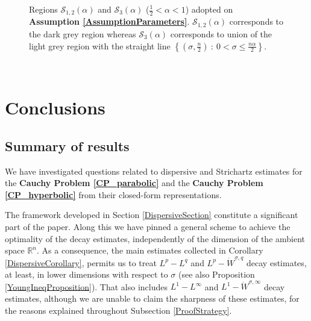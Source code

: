 \documentclass{amsart}
\theoremstyle{definition}
\theoremstyle{remark}
\numberwithin{equation}{section}
\newcommand{\BR}{{\mathbb R}}
\begin{document}
\begin{figure}
			\caption{Regions $\mathcal{S}_{1,2}(\alpha)$ and $\mathcal{S}_{3}(\alpha)$ ($\frac{1}{2}<\alpha<1$) adopted on {\bf Assumption \ref{AssumptionParameters}}. $\mathcal{S}_{1,2}(\alpha)$ corresponds to the dark grey region whereas $\mathcal{S}_3(\alpha)$ corresponds to union of the light grey region with the straight line $\displaystyle \left\{\left(\sigma,\frac{n}{2}\right)~:~0<\sigma\leq\frac{n\alpha}{2}\right\}.$}\label{StrichartzFigure2} 
		\end{figure}
		
		
		\newpage
		~
		\newpage
		\section{Conclusions}\label{Conclusions}
		
		\subsection{Summary of results}
		
		We have investigated questions related to dispersive and Strichartz estimates for the {\bf Cauchy Problem \ref{CP_parabolic}} and the {\bf Cauchy Problem \ref{CP_hyperbolic}} from their closed-form representations.
		
		The framework developed in Section \ref{DispersiveSection} constitute a significant part of the paper. Along this we have pinned a general scheme to achieve the optimality of the decay estimates, independently of the dimension of the ambient space $\BR^n$. As a consequence, the main estimates collected in Corollary \ref{DispersiveCorollary}, permits us to treat $L^p-L^q$ and $L^p-\dot{W}^{\sigma,q}$ decay estimates, at least, in lower dimensions with respect to $\sigma$ (see also Proposition \ref{YoungIneqProposition}). That also includes $L^1-L^\infty$ and $L^1-\dot{W}^{\sigma,\infty}$ decay estimates, although we are unable to claim the sharpness of these estimates, for the reasons explained throughout Subsection \ref{ProofStrategy}.
		
\end{document}
